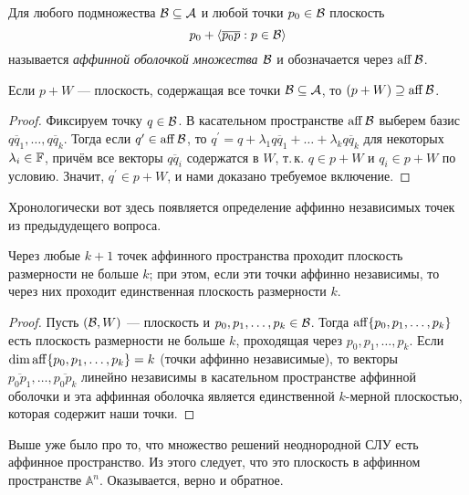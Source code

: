 \begin{definition}
    Для любого подмножества $\mathcal{B} \subseteq \mathcal{A}$ и любой точки $p_0 \in \mathcal{B}$ плоскость
    \[
        p_0 + \langle\overline{p_0p} : p \in \mathcal{B}\rangle
    \]
    называется \textit{аффинной оболочкой множества $\mathcal{B}$} и обозначается через $\operatorname{aff}\mathcal{B}$.
\end{definition}

\begin{proposal}
    Если $p + W$ --- плоскость, содержащая все точки $\mathcal{B} \subseteq \mathcal{A}$, то $(p + W) \supseteq \operatorname{aff}\mathcal{B}$.
\end{proposal}

\begin{proof}
    Фиксируем точку $q \in \mathcal{B}$. В касательном пространстве $\operatorname{aff}\mathcal{B}$ выберем базис $\overline{qq_1}, \ldots, \overline{qq_k}$. Тогда если $q^\prime \in \operatorname{aff}\mathcal{B}$, то $q^\prime = q + \lambda_1\overline{qq_1} + \ldots + \lambda_k\overline{qq_k}$ для некоторых $\lambda_i \in \mathbb{F}$, причём все векторы $\overline{qq_i}$ содержатся в $W$, т.\,к. $q \in p + W$ и $q_i \in p + W$ по условию. Значит, $q^\prime \in p + W$, и нами доказано требуемое включение.
\end{proof}

Хронологически вот здесь появляется определение аффинно независимых точек из предыдудещего вопроса.

\begin{theorem}
    Через любые $k + 1$ точек аффинного пространства проходит плоскость размерности не больше $k$; при этом, если эти точки аффинно независимы, то через них проходит единственная плоскость размерности $k$.
\end{theorem}

\begin{proof}
    Пусть $(\mathcal{B}, W)$ --- плоскость и $p_0, p_1, \ldots, p_k \in \mathcal{B}$. Тогда $\operatorname{aff}\{p_0, p_1, \ldots, p_k\}$ есть плоскость размерности не больше $k$, проходящая через $p_0, p_1, \ldots, p_k$. Если $\dim\operatorname{aff}\{p_0, p_1, \ldots, p_k\} = k$ (точки аффинно независимые), то векторы $\overline{p_0p_1}, \ldots, \overline{p_0p_k}$ линейно независимы в касательном пространстве аффинной оболочки и эта аффинная оболочка является единственной $k$-мерной плоскостью, которая содержит наши точки.
\end{proof}

Выше уже было про то, что множество решений неоднородной СЛУ есть аффинное пространство. Из этого следует, что это плоскость в аффинном пространстве $\mathbb{A}^n$. Оказывается, верно и обратное.


